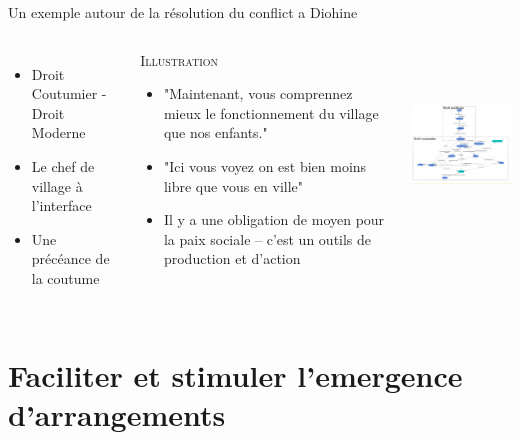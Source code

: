 \documentclass[newPxFont]{beamer}
\begin{document}
  \begin{frame}[c]{Un exemple autour de la résolution du conflict a Diohine}
      \vspace{-1cm}
      \begin{columns}[onlytextwidth,T]
        \column{\dimexpr\linewidth-30mm-5mm}
        \begin{itemize}
          \item Droit Coutumier - Droit Moderne  
          \item Le chef de village à l'interface
          \item Une précéance de la coutume
        \end{itemize}
        
        \small{
          \begin{exampleblock}{\textsc{Illustration}}
            \begin{itemize}
              \item "Maintenant, vous comprennez mieux le fonctionnement du village que nos enfants."
              \item "Ici vous voyez on est bien moins libre que vous en ville"
              \item Il y a une obligation de moyen pour la paix sociale -- c'est un outils de production et d'action
            \end{itemize}
          \end{exampleblock}
        }
        \column{30mm}
        \vspace{1.5cm}
        \includegraphics[height=5cm]{img/zone_droit_conflits.png}
      \end{columns}
    \end{frame}


\section{Faciliter et stimuler l'emergence d'arrangements}
\end{document}
